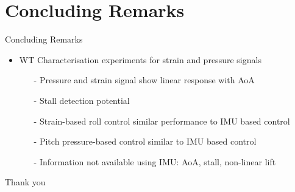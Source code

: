 \documentclass[aspectratio=169]{beamer}            %
\begin{document}
\section{Concluding Remarks}
\begin{frame}{Concluding Remarks}

  \pause
  \begin{itemize}[<+->]
    \item WT Characterisation experiments for strain and pressure signals
		  \begin{itemize}[<+->]
			  \item[-]{Pressure and strain signal show linear response with AoA}
        \item[-]{Stall detection potential}
				\item[-]{Strain-based roll control similar performance to IMU based control}
        \item[-]{Pitch pressure-based control similar to IMU based control}
			  \item[-]{Information not available using IMU: AoA, stall, non-linear lift}
			\end{itemize}
  \end{itemize}
	  
\end{frame}

%

\begin{frame}{}

  \centering
	\Huge{Thank you}

\end{frame}

\end{document}
